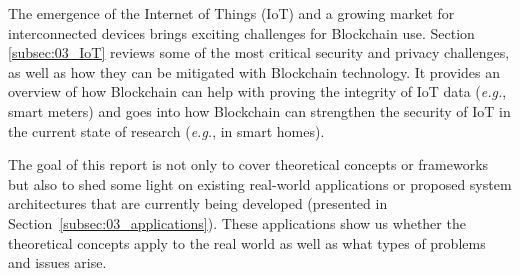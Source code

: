 The emergence of the Internet of Things (IoT) and a growing market for interconnected devices brings exciting challenges for Blockchain use. Section \ref{subsec:03_IoT} reviews some of the most critical security and privacy challenges, as well as how they can be mitigated with Blockchain technology. It provides an overview of how Blockchain can help with proving the integrity of IoT data (\textit{e.g.}, smart meters) and goes into how Blockchain can strengthen the security of IoT in the current state of research (\textit{e.g.}, in smart homes).

The goal of this report is not only to cover theoretical concepts or frameworks but also to shed some light on existing real-world applications or proposed system architectures that are currently being developed (presented in Section~\ref{subsec:03_applications}). These applications show us whether the theoretical concepts apply to the real world as well as what types of problems and issues arise.
